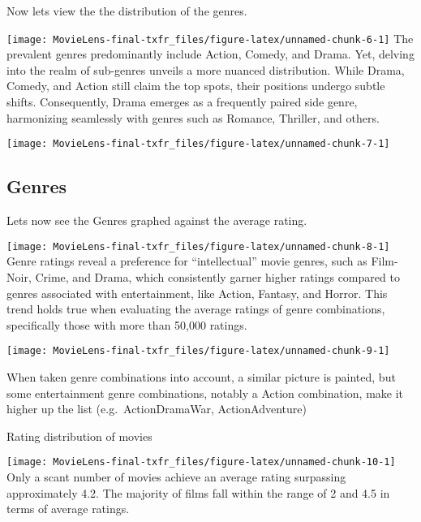 \documentclass[
]{article}
\begin{document}
\begin{center} Now lets view the the distribution of the genres.\end{center}

\texttt{[image: MovieLens-final-txfr\_files/figure-latex/unnamed-chunk-6-1]}
The prevalent genres predominantly include Action, Comedy, and Drama.
Yet, delving into the realm of sub-genres unveils a more nuanced
distribution. While Drama, Comedy, and Action still claim the top spots,
their positions undergo subtle shifts. Consequently, Drama emerges as a
frequently paired side genre, harmonizing seamlessly with genres such as
Romance, Thriller, and others.

\texttt{[image: MovieLens-final-txfr\_files/figure-latex/unnamed-chunk-7-1]}

\newpage

\hypertarget{genres}{%
\subsection{Genres}\label{genres}}

\begin{center} Lets now see the Genres graphed against the average rating. \end{center}

\texttt{[image: MovieLens-final-txfr\_files/figure-latex/unnamed-chunk-8-1]}
Genre ratings reveal a preference for ``intellectual'' movie genres,
such as Film-Noir, Crime, and Drama, which consistently garner higher
ratings compared to genres associated with entertainment, like Action,
Fantasy, and Horror. This trend holds true when evaluating the average
ratings of genre combinations, specifically those with more than 50,000
ratings.

\texttt{[image: MovieLens-final-txfr\_files/figure-latex/unnamed-chunk-9-1]}

When taken genre combinations into account, a similar picture is
painted, but some entertainment genre combinations, notably a Action
combination, make it higher up the list
(e.g.~Action\textbar Drama\textbar War, Action\textbar Adventure)

\newpage
\begin{center} Rating distribution of movies \end{center}

\texttt{[image: MovieLens-final-txfr\_files/figure-latex/unnamed-chunk-10-1]}
Only a scant number of movies achieve an average rating surpassing
approximately 4.2. The majority of films fall within the range of 2 and
4.5 in terms of average ratings.
\end{document}
